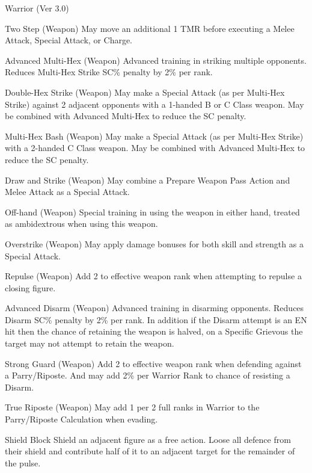 \begin{Chapter}{Warrior (Ver 3.0)}
\begin{Description}
\item[Two Step (Weapon)] May move an additional 1 TMR before executing
  a Melee Attack, Special Attack, or Charge.

\item[Advanced Multi-Hex (Weapon)] Advanced training in striking multiple
opponents. Reduces Multi-Hex Strike SC\% penalty by 2\% per rank.

\item[Double-Hex Strike (Weapon)] May make a Special Attack (as per
  Multi-Hex Strike) against 2 adjacent opponents with a 1-handed B or
  C Class weapon.  May be combined with Advanced Multi-Hex to reduce
  the SC penalty.

\item[Multi-Hex Bash (Weapon)] May make a Special Attack (as per
  Multi-Hex Strike) with a 2-handed C Class weapon.  May be combined
  with Advanced Multi-Hex to reduce the SC penalty.

\item[Draw and Strike (Weapon)] May combine a Prepare Weapon Pass
  Action and Melee Attack as a Special Attack.

\item[Off-hand (Weapon)] Special training in using the weapon in
  either hand, treated as ambidextrous when using this weapon.

\item[Overstrike (Weapon)] May apply damage bonuses for both skill and
  strength as a Special Attack.

\item[Repulse (Weapon)] Add 2 to effective weapon rank when attempting
  to repulse a closing figure.

\item[Advanced Disarm (Weapon)] Advanced training in disarming
  opponents.  Reduces Disarm SC\% penalty by 2\% per rank.  In
  addition if the Disarm attempt is an EN hit then the chance of
  retaining the weapon is halved, on a Specific Grievous the target
  may not attempt to retain the weapon.

\item[Strong Guard (Weapon)] Add 2 to effective weapon rank when
  defending against a Parry/Riposte.  And may add 2\% per Warrior Rank
  to chance of resisting a Disarm.

\item[True Riposte (Weapon)] May add 1 per 2 full ranks in Warrior to
  the Parry/Riposte Calculation when evading.

\item[Shield Block] Shield an adjacent figure as a free action.  Loose
  all defence from their shield and contribute half of it to an
  adjacent target for the remainder of the pulse.


\end{Description}
\end{Chapter}
